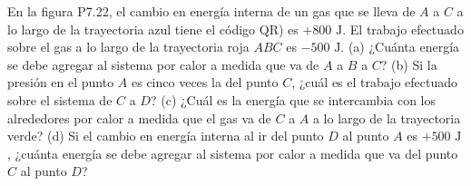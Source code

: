 \item En la figura P7.22, el cambio en energía interna de un gas que se lleva de $A$ a $C$ a lo largo de la trayectoria azul tiene el código QR) es $+800\text{ J}$. El trabajo efectuado sobre el gas a lo largo de la trayectoria roja $ABC$ es $-500\text{ J}$. (a) ¿Cuánta energía se debe agregar al sistema por calor a medida que va de $A$ a $B$ a $C$? (b) Si la presión en el punto $A$ es cinco veces la del punto $C$, ¿cuál es el trabajo efectuado sobre el sistema de $C$ a $D$? (c) ¿Cuál es la energía que se intercambia con los alrededores por calor a medida que el gas va de $C$ a $A$ a lo largo de la trayectoria verde? (d) Si el cambio en energía interna al ir del punto $D$ al punto $A$ es $+500\text{ J}$, ¿cuánta energía se debe agregar al sistema por calor a medida que va del punto $C$ al punto $D$?
